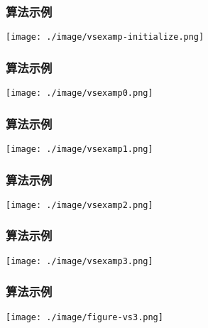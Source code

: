 \documentclass{beamer}
\begin{document}
\begin{frame}
\frametitle{算法示例}
\label{sec-3-7}

\center
\texttt{[image: ./image/vsexamp-initialize.png]}
\end{frame}
\begin{frame}
\frametitle{算法示例}
\label{sec-3-8}

\center
\texttt{[image: ./image/vsexamp0.png]}
\end{frame}
\begin{frame}
\frametitle{算法示例}
\label{sec-3-9}

\center
\texttt{[image: ./image/vsexamp1.png]}
\end{frame}
\begin{frame}
\frametitle{算法示例}
\label{sec-3-10}

\center
\texttt{[image: ./image/vsexamp2.png]}
\end{frame}
\begin{frame}
\frametitle{算法示例}
\label{sec-3-11}

\center
\texttt{[image: ./image/vsexamp3.png]}
\end{frame}
\begin{frame}
\frametitle{算法示例}
\label{sec-3-12}

\center
\texttt{[image: ./image/figure-vs3.png]}
\end{frame}
\end{document}
